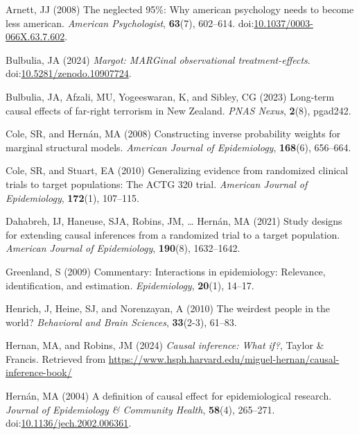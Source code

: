 \documentclass[
  single column]{article}
\newlength{\cslhangindent}
\newenvironment{CSLReferences}[2] %
 {\begin{list}{}{%
  \setlength{\itemindent}{0pt}
  \setlength{\leftmargin}{0pt}
  \setlength{\parsep}{0pt}
  \ifodd #1
   \setlength{\leftmargin}{\cslhangindent}
   \setlength{\itemindent}{-1\cslhangindent}
  \fi
  \setlength{\itemsep}{#2\baselineskip}}}
 {\end{list}}
\begin{document}
\label{refs}
\begin{CSLReferences}{1}{0}
Arnett, JJ (2008) The neglected 95\%: Why american psychology needs to
become less american. \emph{American Psychologist}, \textbf{63}(7),
602--614.
doi:\href{https://doi.org/10.1037/0003-066X.63.7.602}{10.1037/0003-066X.63.7.602}.

Bulbulia, JA (2024) \emph{Margot: MARGinal observational
treatment-effects}.
doi:\href{https://doi.org/10.5281/zenodo.10907724}{10.5281/zenodo.10907724}.

Bulbulia, JA, Afzali, MU, Yogeeswaran, K, and Sibley, CG (2023)
Long-term causal effects of far-right terrorism in {N}ew {Z}ealand.
\emph{PNAS Nexus}, \textbf{2}(8), pgad242.

Cole, SR, and Hernán, MA (2008) Constructing inverse probability weights
for marginal structural models. \emph{American Journal of Epidemiology},
\textbf{168}(6), 656--664.

Cole, SR, and Stuart, EA (2010) Generalizing evidence from randomized
clinical trials to target populations: The ACTG 320 trial.
\emph{American Journal of Epidemiology}, \textbf{172}(1), 107--115.

Dahabreh, IJ, Haneuse, SJA, Robins, JM, \ldots{} Hernán, MA (2021) Study
designs for extending causal inferences from a randomized trial to a
target population. \emph{American Journal of Epidemiology},
\textbf{190}(8), 1632--1642.

Greenland, S (2009) Commentary: Interactions in epidemiology: Relevance,
identification, and estimation. \emph{Epidemiology}, \textbf{20}(1),
14--17.

Henrich, J, Heine, SJ, and Norenzayan, A (2010) The weirdest people in
the world? \emph{Behavioral and Brain Sciences}, \textbf{33}(2-3),
61--83.

Hernan, MA, and Robins, JM (2024) \emph{Causal inference: What if?},
Taylor \& Francis. Retrieved from
\url{https://www.hsph.harvard.edu/miguel-hernan/causal-inference-book/}

Hernán, MA (2004) A definition of causal effect for epidemiological
research. \emph{Journal of Epidemiology \& Community Health},
\textbf{58}(4), 265--271.
doi:\href{https://doi.org/10.1136/jech.2002.006361}{10.1136/jech.2002.006361}.


\end{CSLReferences}
\end{document}
